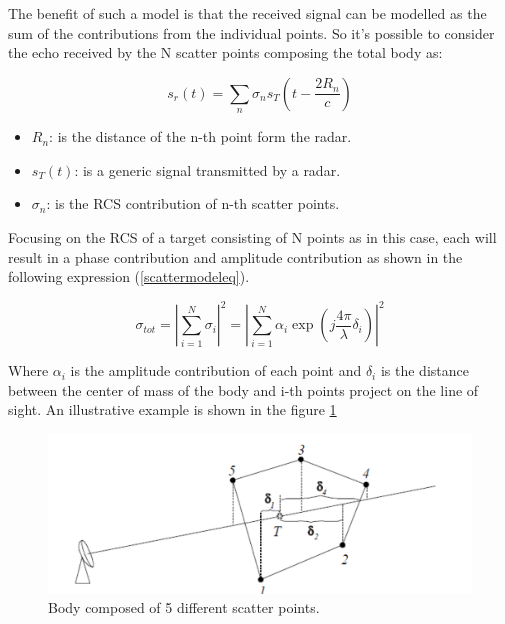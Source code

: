 The benefit of such a model is that the received signal can be modelled as the sum of the contributions from the individual points. 
So it's possible to consider the echo received by the N scatter points composing the total body as:

\begin{equation}
s_{r}(t)=\sum_{n} \sigma_{n} s_{T}\left(t-\frac{2 R_{n}}{c}\right)
\label{generalscatterpointreceivedsignal}
\end{equation}

\begin{itemize}
     \item \textbf{$R_{n}$}: is the distance of the n-th point form the radar.

         
    \item \textbf{$s_{T}(t)$}: is a generic signal transmitted by a radar.
         
    \item \textbf{$\sigma_{n}$}: is the RCS contribution of n-th scatter points.
        
\end{itemize}

Focusing on the RCS of a target consisting of N points as in this case, each will result in a phase contribution and amplitude contribution as shown in the following expression (\ref{scattermodeleq}).

\begin{equation}
\sigma_{tot}=\left|\sum_{i=1}^{N} \sigma_{i}\right|^{2} =\left|\sum_{i=1}^{N} \alpha_{i} \exp \left(j \frac{4 \pi}{\lambda} \delta_{i}\right)\right|^{2}
\label{scattermodeleq}
\end{equation}

Where $\alpha_{i}$ is the amplitude contribution of each point and $\delta_{i}$ is the distance between the center of mass of the body and i-th points project on the line of sight. An illustrative example is shown in the figure \ref{ComplexRCS}

\begin{figure}[h!]
    \centering
    \includegraphics[width=16cm]{Time-frequency analysis-chap3/img/RCS complex body.png}
    \caption{Body composed of 5 different scatter points. \cite{galati_radar}}
    \label{ComplexRCS}
\end{figure}


